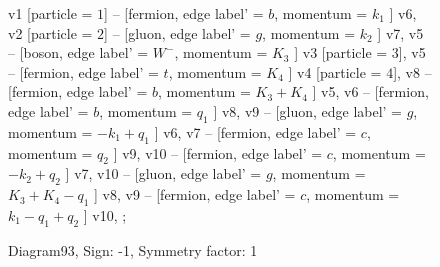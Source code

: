 \documentclass{revtex4}
\begin{document}
\begin{figure}[!htb]
\begin{center}
{    %
v1 [particle = \(1\)] -- [fermion, edge label' = \(b\), momentum = \(k_{1}\) ] v6, 
v2 [particle = \(2\)] -- [gluon, edge label' = \(g\), momentum = \(k_{2}\) ] v7, 
v5 -- [boson, edge label' = \(W^{-}\), momentum = \(K_{3}\) ] v3 [particle = \(3\)], 
v5 -- [fermion, edge label' = \(t\), momentum = \(K_{4}\) ] v4 [particle = \(4\)], 
v8 -- [fermion, edge label' = \(b\), momentum = \(K_{3} + K_{4}\) ] v5, 
v6 -- [fermion, edge label' = \(b\), momentum = \(q_{1}\) ] v8, 
v9 -- [gluon, edge label' = \(g\), momentum = \(-k_{1} + q_{1}\) ] v6, 
v7 -- [fermion, edge label' = \(c\), momentum = \(q_{2}\) ] v9, 
v10 -- [fermion, edge label' = \(c\), momentum = \(-k_{2} + q_{2}\) ] v7, 
v10 -- [gluon, edge label' = \(g\), momentum = \(K_{3} + K_{4} - q_{1}\) ] v8, 
v9 -- [fermion, edge label' = \(c\), momentum = \(k_{1} - q_{1} + q_{2}\) ] v10, 
};
\end{center}
\caption{Diagram93, Sign: -1, Symmetry factor: 1}
\end{figure}
\newpage
\end{document}
